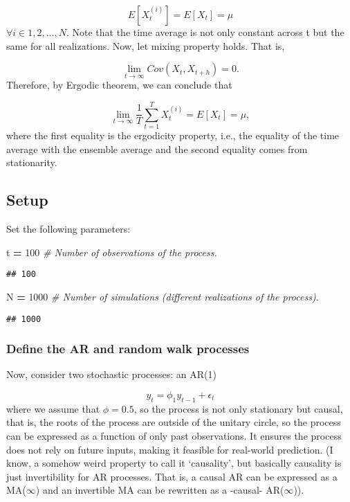 \documentclass[
]{article}
\newenvironment{Shaded}{\begin{snugshade}}{\end{snugshade}}
\newcommand{\CommentTok}[1]{\textcolor[rgb]{0.56,0.35,0.01}{\textit{#1}}}
\newcommand{\FloatTok}[1]{\textcolor[rgb]{0.00,0.00,0.81}{#1}}
\newcommand{\NormalTok}[1]{#1}
\newcommand{\OperatorTok}[1]{\textcolor[rgb]{0.81,0.36,0.00}{\textbf{#1}}}
\begin{document}
\[
E[X_t^{(i)}] = E[X_t] = \mu
\] \(\forall i \in {1, 2, ..., N}\). Note that the time average is not
only constant across t but the same for all realizations. Now, let
mixing property holds. That is,

\[
\lim_{t \to \infty} Cov(X_t, X_{t+h}) = 0.
\] Therefore, by Ergodic theorem, we can conclude that

\[
\lim_{t \to \infty} \frac{1}{T} \sum_{t=1}^{T} X_t^{(i)} = E[X_t] = \mu,
\] where the first equality is the ergodicity property, i.e., the
equality of the time average with the ensemble average and the second
equality comes from stationarity.

\hypertarget{setup}{%
\subsection{Setup}\label{setup}}

Set the following parameters:

\begin{Shaded}
\begin{Highlighting}[]
\NormalTok{t }\OperatorTok{=} \FloatTok{100} \CommentTok{\# Number of observations of the process.}
\end{Highlighting}
\end{Shaded}

\begin{verbatim}
## 100
\end{verbatim}

\begin{Shaded}
\begin{Highlighting}[]
\NormalTok{N }\OperatorTok{=} \FloatTok{1000} \CommentTok{\# Number of simulations (different realizations of the process).}
\end{Highlighting}
\end{Shaded}

\begin{verbatim}
## 1000
\end{verbatim}

\hypertarget{define-the-ar-and-random-walk-processes}{%
\subsubsection{Define the AR and random walk
processes}\label{define-the-ar-and-random-walk-processes}}

Now, consider two stochastic processes: an AR(1)

\[
y_t = \phi_1 y_{t-1} + \epsilon_t
\] where we assume that \(\phi = 0.5\), so the process is not only
stationary but causal, that is, the roots of the process are outside of
the unitary circle, so the process can be expressed as a function of
only past observations. It ensures the process does not rely on future
inputs, making it feasible for real-world prediction. (I know, a somehow
weird property to call it `causality', but basically causality is just
invertibility for AR processes. That is, a causal AR can be expressed as
a MA(\(\infty\)) and an invertible MA can be rewritten as a -causal-
AR(\(\infty\))).
\end{document}
